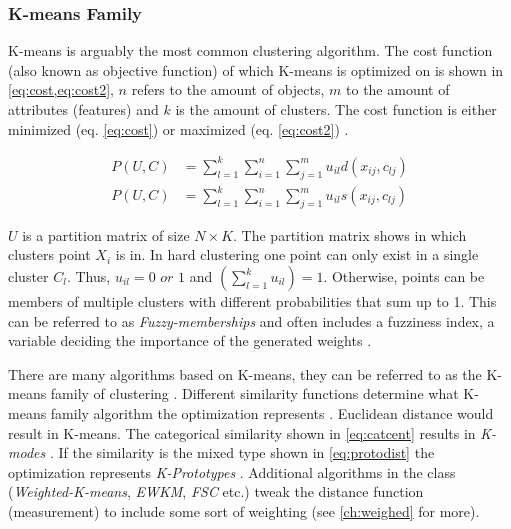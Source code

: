 \documentclass[../report.tex]{subfiles}
\begin{document}
\subsubsection{K-means Family}
\label{sub:family}
K-means is arguably the most common clustering algorithm. The cost function (also known as objective function) of which K-means is optimized on is shown in \cref{eq:cost,eq:cost2}, $n$ refers to the amount of objects, $m$ to the amount of attributes (features) and $k$ is the amount of clusters. The cost function is either minimized (eq. \ref{eq:cost}) or maximized (eq. \ref{eq:cost2}) \cite{huang2005automated}.




\begin{align}
  \label{eq:cost}
  P(U,C) &= \sum^k_{l=1} \sum^n_{i=1} \sum^m_{j=1} u_{il} d(x_{ij},c_{lj}) \\
  \label{eq:cost2}
  P(U,C) &= \sum^k_{l=1} \sum^n_{i=1} \sum^m_{j=1} u_{il} s(x_{ij},c_{lj})
\end{align}

$U$ is a partition matrix of size $N \times K$. The partition matrix shows in which clusters point $X_i$ is in.  In hard clustering one point can only exist in a single cluster $C_l$. Thus, $u_{il} = 0 \textit{ or } 1$ and $(\sum_{ l=1 }^{ k } u_{il}) = 1$. Otherwise, points can be members of multiple clusters with different probabilities that sum up to 1. This can be referred to as \textit{Fuzzy-memberships} and often includes a fuzziness index, a variable deciding the importance of the generated weights \cite{Gan2006}.

There are many algorithms based on K-means, they can be referred to as the K-means family of clustering \cite{Huang1998}. Different similarity functions determine what K-means family algorithm the optimization represents \cite{huang2005automated}. Euclidean distance would result in K-means. The categorical similarity shown in \cref{eq:catcent} results in \textit{K-modes} \cite{Ng1999}. If the similarity is the mixed type shown in \cref{eq:protodist} the optimization represents \textit{K-Prototypes} \cite{Huang97clusteringlarge}. Additional algorithms in the class (\textit{Weighted-K-means}, \textit{EWKM}, \textit{FSC} etc.) \cite{huang2005automated, Jing2007, Gan2016} tweak the distance function (measurement) to include some sort of weighting (see \cref{ch:weighed} for more).
\end{document}
